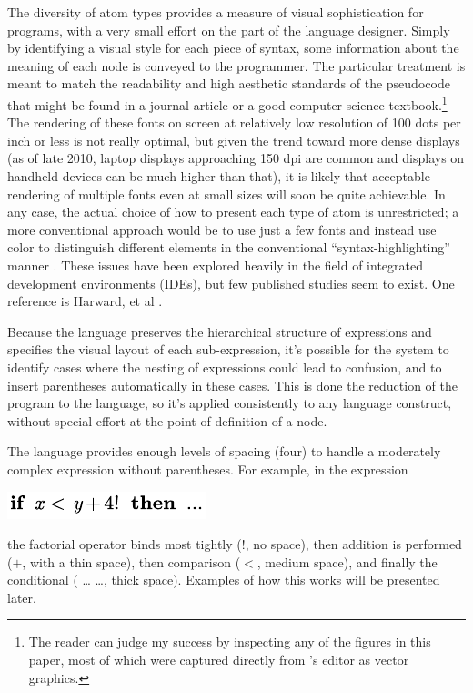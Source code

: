 The diversity of atom types provides a measure of visual sophistication for programs, with a very small effort on the part of the language designer. Simply by identifying a visual style for each piece of syntax, some information about the meaning of each node is conveyed to the programmer. The particular treatment is meant to match the readability and high aesthetic standards of the pseudocode that might be found in a journal article or a good computer science textbook.\footnote{The reader can judge my success by inspecting any of the figures in this paper, most of which were captured directly from \Meta's editor as vector graphics.} The rendering of these fonts on screen at relatively low resolution of 100 dots per inch or less is not really optimal, but given the trend toward more dense displays (as of late 2010, laptop displays approaching 150 dpi are common and displays on handheld devices can be much higher than that), it is likely that acceptable rendering of multiple fonts even at small sizes will soon be quite achievable. In any case, the actual choice of how to present each type of atom is unrestricted; a more conventional approach would be to use just a few fonts and instead use color to distinguish different elements in the conventional ``syntax-highlighting'' manner \cite{lexx}. These issues have been explored heavily in the field of integrated development environments (IDEs), but few published studies seem to exist. One reference is Harward, et al \cite{insitu}.

Because the  language preserves the hierarchical structure of expressions and specifies the visual layout of each sub-expression, it's possible for the system to identify cases where the nesting of expressions could lead to confusion, and to insert parentheses automatically in these cases. This is done  the reduction of the program to the  language, so it's applied consistently to any language construct, without special effort at the point of definition of a node. 

The  language provides enough levels of spacing (four) to handle a moderately complex expression without parentheses. For example, in the expression
\begin{center}
\includegraphics{src/image/space.pdf}
\end{center}  %
the factorial operator binds most tightly ($!$, no space), then addition is performed ($+$, with a thin space), then comparison ($<$, medium space), and finally the conditional ( \dots {} \dots, thick space). Examples of how this works will be presented later.

